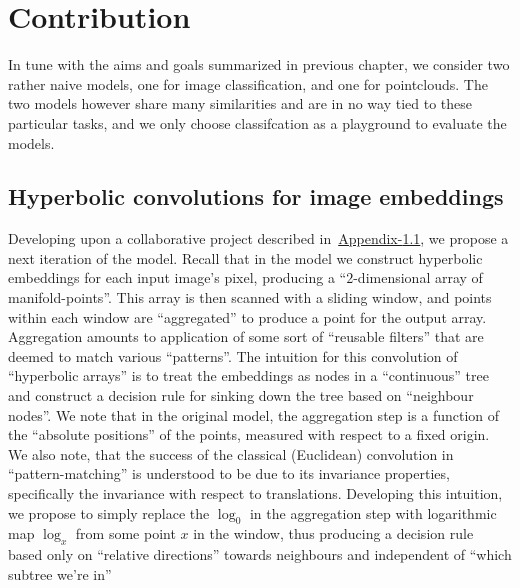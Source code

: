 \chapter{Contribution} \label{chap:conclusion}

In tune with the aims and goals summarized in previous chapter,
we consider two rather naive models, one for image classification, and one for
pointclouds. The two models however share many similarities and are in no way
tied to these particular tasks, and we only choose classifcation as a
playground to evaluate the models.

\section{Hyperbolic convolutions for image embeddings} \label{sec:hconv}

Developing upon a collaborative project described
in~\hyperref[sec:hconv]{Appendix-\ref*{sec:hconv}}, we propose a next
iteration of the model. Recall that in the model we construct hyperbolic
embeddings for each input image's pixel, producing a ``\( 2 \)-dimensional
array of manifold-points''. This array is then scanned with a sliding window,
and points within each window are ``aggregated'' to produce a point for the
output array. Aggregation amounts to application of some sort of ``reusable
filters'' that are deemed to match various ``patterns''. The intuition for this convolution
of ``hyperbolic arrays'' is to treat the embeddings as nodes in a ``continuous'' tree
and construct a decision rule for sinking down the tree based on ``neighbour nodes''.
We note that in the original model, the aggregation step is a function of the
``absolute positions'' of the points, measured with respect to a fixed origin.
We also note, that the success of the classical (Euclidean) convolution in
``pattern-matching'' is understood to be due to its invariance properties,
specifically the invariance with respect to translations. Developing this intuition,
we propose to simply replace the \( \log_0 \) in the aggregation step
with logarithmic map \( \log_x \) from some point \( x \) in the window, thus
producing a decision rule based only on ``relative directions'' towards neighbours
and independent of ``which subtree we're in''

